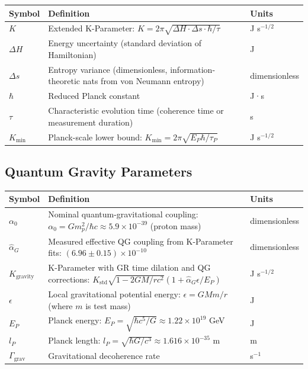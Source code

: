 \documentclass[11pt,a4paper,twoside]{article}
\begin{document}
\begin{longtable}{p{3cm}p{8cm}p{3cm}}
\toprule
\textbf{Symbol} & \textbf{Definition} & \textbf{Units} \\
\midrule
$K$ & Extended K-Parameter: $K = 2\pi\sqrt{\Delta H \cdot \Delta s \cdot \hbar / \tau}$ & J s$^{-1/2}$ \\
$\Delta H$ & Energy uncertainty (standard deviation of Hamiltonian) & J \\
$\Delta s$ & Entropy variance (dimensionless, information-theoretic nats from von Neumann entropy) & dimensionless \\
$\hbar$ & Reduced Planck constant & J·s \\
$\tau$ & Characteristic evolution time (coherence time or measurement duration) & s \\
$K_{\min}$ & Planck-scale lower bound: $K_{\min} = 2\pi\sqrt{E_P \hbar / \tau_P}$ & J s$^{-1/2}$ \\
\bottomrule
\end{longtable}

\subsection*{Quantum Gravity Parameters}

\begin{longtable}{p{3cm}p{8cm}p{3cm}}
\toprule
\textbf{Symbol} & \textbf{Definition} & \textbf{Units} \\
\midrule
$\alpha_0$ & Nominal quantum-gravitational coupling: $\alpha_0 = Gm_p^2/\hbar c \approx 5.9 \times 10^{-39}$ (proton mass) & dimensionless \\
$\hat{\alpha}_G$ & Measured effective QG coupling from K-Parameter fits: $(6.96 \pm 0.15) \times 10^{-10}$ & dimensionless \\
$K_{\text{gravity}}$ & K-Parameter with GR time dilation and QG corrections: $K_{\text{std}}\sqrt{1-2GM/rc^2}(1 + \hat{\alpha}_G \epsilon/E_P)$ & J s$^{-1/2}$ \\
$\epsilon$ & Local gravitational potential energy: $\epsilon = GMm/r$ (where $m$ is test mass) & J \\
$E_P$ & Planck energy: $E_P = \sqrt{\hbar c^5/G} \approx 1.22 \times 10^{19}$ GeV & J \\
$l_P$ & Planck length: $l_P = \sqrt{\hbar G/c^3} \approx 1.616 \times 10^{-35}$ m & m \\
$\Gamma_{\text{grav}}$ & Gravitational decoherence rate & s$^{-1}$ \\
\bottomrule
\end{longtable}
\end{document}
